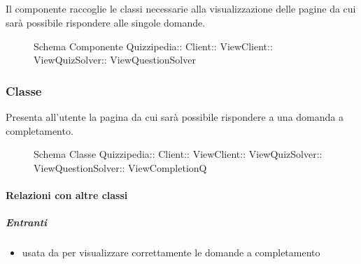 \subsection{}
Il componente raccoglie le classi necessarie alla visualizzazione delle pagine da cui sarà possibile rispondere alle singole domande.
\begin{figure}[H]
\centering
\noindent{}
\caption[Schema Componente ViewQuestionSolver]{Schema Componente Quizzipedia:: Client:: ViewClient:: ViewQuizSolver:: ViewQuestionSolver}
\end{figure}
\subsubsection{Classe }
Presenta all'utente la pagina da cui sarà possibile rispondere a una domanda a completamento.
\begin{figure}[H]
\centering
\noindent{}
\caption[Schema Classe ViewCompletionQ]{Schema Classe Quizzipedia:: Client:: ViewClient:: ViewQuizSolver:: ViewQuestionSolver:: ViewCompletionQ}
\end{figure}
\paragraph{Relazioni con altre classi}
\subparagraph{Entranti}
\begin{itemize}
\item usata da  per visualizzare correttamente le domande a completamento
\end{itemize}
